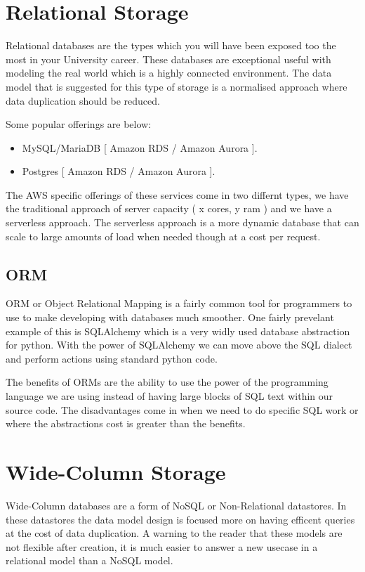\documentclass{csse4400}
\begin{document}
\section{Relational Storage}

Relational databases are the types which you will have been exposed too the most in your University career.
These databases are exceptional useful with modeling the real world which is a highly connected environment.
The data model that is suggested for this type of storage is a normalised approach where data duplication should 
be reduced.


Some popular offerings are below:

\begin{itemize}
  \item MySQL/MariaDB [ Amazon RDS / Amazon Aurora ].
  \item Postgres [ Amazon RDS / Amazon Aurora ].
\end{itemize}

The AWS specific offerings of these services come in two differnt types, we have the traditional approach of
server capacity ( x cores, y ram ) and we have a serverless approach. The serverless approach is a more dynamic
database that can scale to large amounts of load when needed though at a cost per request.

  \subsection{ORM}
  ORM or Object Relational Mapping is a fairly common tool for programmers to use to make developing with 
  databases much smoother. One fairly prevelant example of this is SQLAlchemy which is a very widly used 
  database abstraction for python. With the power of SQLAlchemy we can move above the SQL dialect and perform
  actions using standard python code.

  The benefits of ORMs are the ability to use the power of the programming language we are using instead of having
  large blocks of SQL text within our source code. The disadvantages come in when we need to do specific SQL work
  or where the abstractions cost is greater than the benefits.

\section{Wide-Column Storage}

Wide-Column databases are a form of NoSQL or Non-Relational datastores. In these datastores the data model design 
is focused more on having efficent queries at the cost of data duplication. A warning to the reader that these models
are not flexible after creation, it is much easier to answer a new usecase in a relational model than a NoSQL model.
\end{document}
